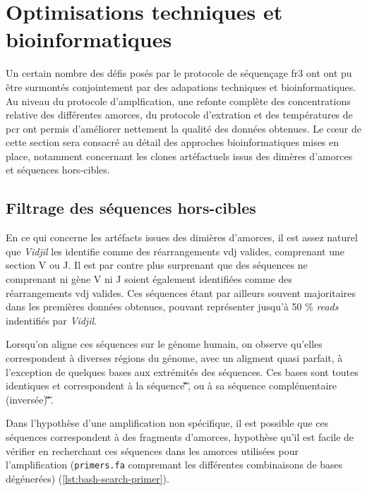 \section{Optimisations techniques et bioinformatiques}

Un certain nombre des défis posés par le protocole de séquençage \gls{fr}3 ont ont pu être surmontés conjointement par 
des adapations techniques et bioinformatiques. Au niveau du protocole d'amplfication, une refonte complète des concentrations 
relative des différentes amorces, du protocole d'extration et des températures de \gls{pcr} ont permis d'améliorer nettement 
la qualité des données obtenues. Le cœur de cette section sera consacré au détail des approches bioinformatiques mises en place, 
notamment concernant les clones artéfactuels issus des dimères d'amorces et séquences hors-cibles.

\subsection{Filtrage des séquences hors-cibles}

En ce qui concerne les artéfacts issues des dimières d'amorces, il est assez naturel que \textit{Vidjil} les identifie comme 
des réarrangements \gls{vdj} valides, comprenant une section V ou J. Il est par contre plus surprenant que des séquences ne comprenant 
ni gène V ni J soient également identifiées comme des réarrangements \gls{vdj} valides. Ces séquences étant par ailleurs souvent majoritaires 
dans les premières données obtenues, pouvant représenter jusqu'à 50 \% \textit{reads} indentifiés par \textit{Vidjil}.

\vspace{1em}

Lorsqu'on aligne ces séquences sur le génome humain, on observe qu'elles correspondent à diverses régions du génome, avec un aligment quasi 
parfait, à l'exception de quelques bases aux extrémités des séquences. Ces bases sont toutes identiques et correspondent à la séquence 
\C\G\T\C\T\C\C\T\C\A\G\G\T\A\A\G, ou à sa séquence complémentaire (inversée) \C\T\T\A\C\C\T\G\A\G\G\A\G\A\C\G.

\vspace{1em}

Dans l'hypothèse d'une amplification non spécifique, il est possible que ces séquences correspondent à des fragments d'amorces,
hypothèse qu'il est facile de vérifier en recherchant ces séquences dans les amorces utilisées pour l'amplification (\texttt{primers.fa} 
compremant les différentes combinaisons de bases dégénerées)
(\autoref{lst:bash-search-primer}).

